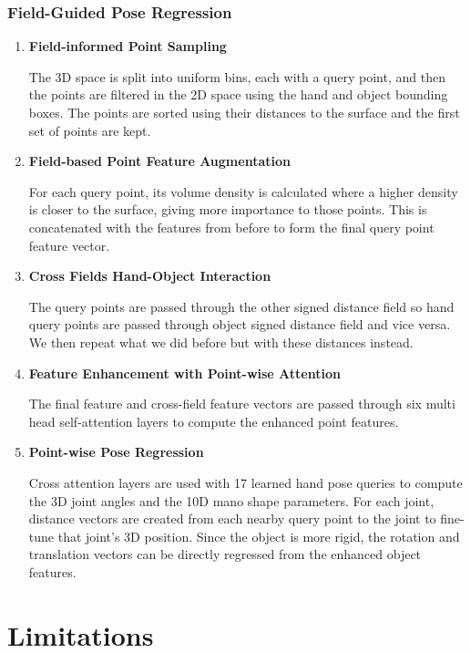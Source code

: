 \documentclass{article}
\begin{document}
\subsubsection*{Field-Guided Pose Regression}
\begin{enumerate}
    \item \textbf{Field-informed Point Sampling}
    
    The 3D space is split into uniform bins, each with a query point, and then the points are
    filtered in the 2D space using the hand and object bounding boxes. The points are sorted using
    their distances to the surface and the first set of points are kept.
    
    \item \textbf{Field-based Point Feature Augmentation}
    
    For each query point, its volume density is calculated where a higher density is closer to the
    surface, giving more importance to those points. This is concatenated with the features from
    before to form the final query point feature vector.

    \item \textbf{Cross Fields Hand-Object Interaction}
    
    The query points are passed through the other signed distance field so hand query points are
    passed through object signed distance field and vice versa. We then repeat what we did before
    but with these distances instead.

    \item \textbf{Feature Enhancement with Point-wise Attention}
    
    The final feature and cross-field feature vectors are passed through six multi head
    self-attention layers to compute the enhanced point features.

    \item \textbf{Point-wise Pose Regression}
    
    Cross attention layers are used with 17 learned hand pose queries to compute the 3D joint
    angles and the 10D mano shape parameters. For each joint, distance vectors are created from
    each nearby query point to the joint to fine-tune that joint’s 3D position. Since the object is
    more rigid, the rotation and translation vectors can be directly regressed from the enhanced
    object features.
\end{enumerate}

\section*{Limitations}
\end{document}
